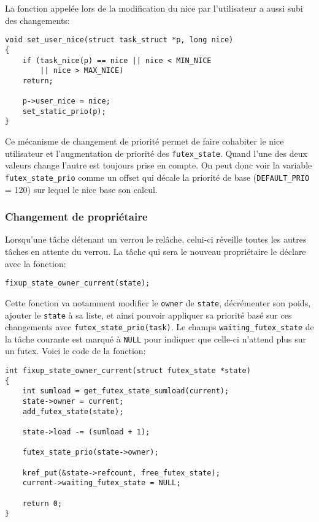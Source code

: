 La fonction appelée lors de la modification du nice par l'utilisateur a aussi
subi des changements:
\begin{lstlisting}[tabsize=4]
void set_user_nice(struct task_struct *p, long nice)
{
	if (task_nice(p) == nice || nice < MIN_NICE 
		|| nice > MAX_NICE)
	return;
	
	p->user_nice = nice;
	set_static_prio(p);
}
\end{lstlisting} 

Ce mécanisme de changement de priorité permet de faire cohabiter le nice utilisateur
et l'augmentation de priorité des \verb|futex_state|.
Quand l'une des deux valeurs change l'autre est toujours prise en compte.
On peut donc voir la variable \verb|futex_state_prio| comme un offset qui décale la priorité de base
(\verb|DEFAULT_PRIO| = 120) sur lequel le nice base son calcul.



\subsubsection{Changement de propriétaire}

Lorsqu'une tâche détenant un verrou le relâche, celui-ci réveille toutes les autres tâches en attente
du verrou. La tâche qui sera le nouveau propriétaire le déclare avec la fonction:
\begin{lstlisting}[tabsize=4]
	fixup_state_owner_current(state);
\end{lstlisting}
Cette fonction va notamment modifier le \verb|owner| de \verb|state|, décrémenter son poids, ajouter 
le \verb|state| à sa liste, et ainsi pouvoir appliquer sa priorité basé sur ces changements avec
\verb|futex_state_prio(task)|. Le champs \newline \verb|waiting_futex_state| de la tâche courante est marqué à \verb|NULL|
pour indiquer que celle-ci n'attend plus sur un futex. Voici le code de la fonction:

\begin{lstlisting}[tabsize=4]
int fixup_state_owner_current(struct futex_state *state)
{
	int sumload = get_futex_state_sumload(current);
	state->owner = current;
	add_futex_state(state);

	state->load -= (sumload + 1);	

	futex_state_prio(state->owner);
	
	kref_put(&state->refcount, free_futex_state);
	current->waiting_futex_state = NULL;
	
	return 0;
}
\end{lstlisting}

